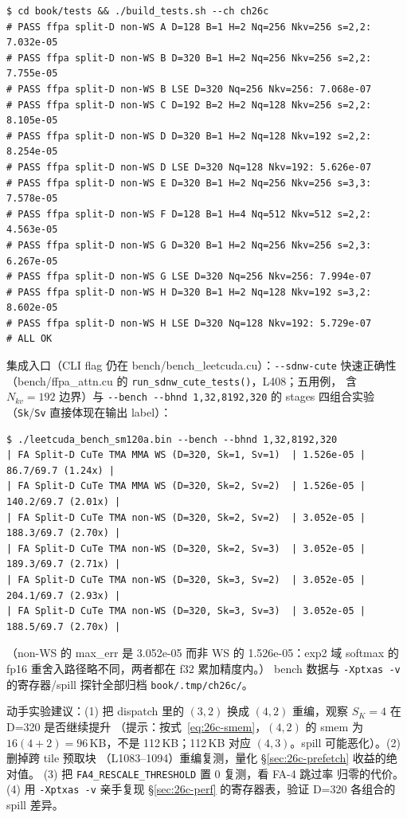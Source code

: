 \begin{lstlisting}[style=console]
$ cd book/tests && ./build_tests.sh --ch ch26c
# PASS ffpa split-D non-WS A D=128 B=1 H=2 Nq=256 Nkv=256 s=2,2: 7.032e-05
# PASS ffpa split-D non-WS B D=320 B=1 H=2 Nq=256 Nkv=256 s=2,2: 7.755e-05
# PASS ffpa split-D non-WS B LSE D=320 Nq=256 Nkv=256: 7.068e-07
# PASS ffpa split-D non-WS C D=192 B=2 H=2 Nq=128 Nkv=256 s=2,2: 8.105e-05
# PASS ffpa split-D non-WS D D=320 B=1 H=2 Nq=128 Nkv=192 s=2,2: 8.254e-05
# PASS ffpa split-D non-WS D LSE D=320 Nq=128 Nkv=192: 5.626e-07
# PASS ffpa split-D non-WS E D=320 B=1 H=2 Nq=256 Nkv=256 s=3,3: 7.578e-05
# PASS ffpa split-D non-WS F D=128 B=1 H=4 Nq=512 Nkv=512 s=2,2: 4.563e-05
# PASS ffpa split-D non-WS G D=320 B=1 H=2 Nq=256 Nkv=256 s=2,3: 6.267e-05
# PASS ffpa split-D non-WS G LSE D=320 Nq=256 Nkv=256: 7.994e-07
# PASS ffpa split-D non-WS H D=320 B=1 H=2 Nq=128 Nkv=192 s=3,2: 8.602e-05
# PASS ffpa split-D non-WS H LSE D=320 Nq=128 Nkv=192: 5.729e-07
# ALL OK
\end{lstlisting}

集成入口（CLI flag 仍在 bench/bench\_leetcuda.cu）：\texttt{-{}-sdnw-cute} 快速正确性
（bench/ffpa\_attn.cu 的 \texttt{run\_sdnw\_cute\_tests()}，L408；五用例，
含 $N_{kv}{=}192$ 边界）与 \texttt{-{}-bench -{}-bhnd 1,32,8192,320}
的 stages 四组合实验（\texttt{Sk}/\texttt{Sv} 直接体现在输出 label）：

\begin{lstlisting}[style=console]
$ ./leetcuda_bench_sm120a.bin --bench --bhnd 1,32,8192,320
| FA Split-D CuTe TMA MMA WS (D=320, Sk=1, Sv=1)  | 1.526e-05 |  86.7/69.7 (1.24x) |
| FA Split-D CuTe TMA MMA WS (D=320, Sk=2, Sv=2)  | 1.526e-05 | 140.2/69.7 (2.01x) |
| FA Split-D CuTe TMA non-WS (D=320, Sk=2, Sv=2)  | 3.052e-05 | 188.3/69.7 (2.70x) |
| FA Split-D CuTe TMA non-WS (D=320, Sk=2, Sv=3)  | 3.052e-05 | 189.3/69.7 (2.71x) |
| FA Split-D CuTe TMA non-WS (D=320, Sk=3, Sv=2)  | 3.052e-05 | 204.1/69.7 (2.93x) |
| FA Split-D CuTe TMA non-WS (D=320, Sk=3, Sv=3)  | 3.052e-05 | 188.5/69.7 (2.70x) |
\end{lstlisting}

（non-WS 的 max\_err 是 3.052e-05 而非 WS 的 1.526e-05：exp2 域
softmax 的 fp16 重舍入路径略不同，两者都在 f32 累加精度内。）
bench 数据与 \texttt{-Xptxas -v} 的寄存器/spill 探针全部归档
\texttt{book/.tmp/ch26c/}。

动手实验建议：(1) 把 dispatch 里的
$(3,2)$ 换成 $(4,2)$ 重编，观察 $S_K{=}4$ 在 D=320 是否继续提升
（提示：按式~\eqref{eq:26c-smem}，$(4,2)$ 的 smem 为
$16(4+2)=96$\,KB，不是 112\,KB；112\,KB 对应 $(4,3)$。spill 可能恶化）。(2) 删掉跨 tile 预取块
（L1083--1094）重编复测，量化 \S\ref{sec:26c-prefetch} 收益的绝对值。
(3) 把 \texttt{FA4\_RESCALE\_THRESHOLD} 置 0 复测，看 FA-4 跳过率
归零的代价。(4) 用 \texttt{-Xptxas -v} 亲手复现 \S\ref{sec:26c-perf}
的寄存器表，验证 D=320 各组合的 spill 差异。

